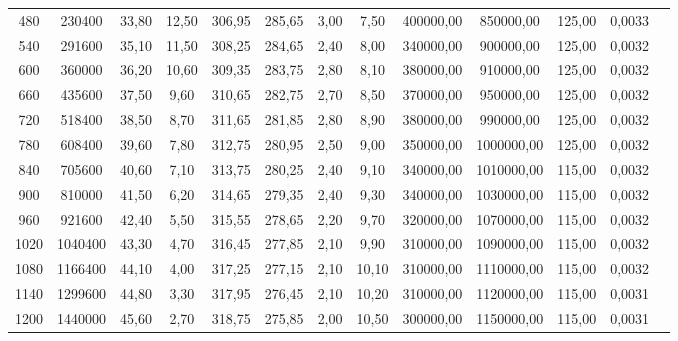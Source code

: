 \begin{table}
\begin{tabular}{S[table-format=3.0] S S S S S S S S S S S S[table-format=3.2]}
       480  &    230400   &   33,80   &    12,50   &  306,95   &  285,65   &      3,00   &      7,50   &  400000,00   &   850000,00   &  125,00    &      0,0033  \\
       540  &    291600   &   35,10   &    11,50   &  308,25   &  284,65   &      2,40   &      8,00   &  340000,00   &   900000,00   &  125,00    &      0,0032  \\
       600  &    360000   &   36,20   &    10,60   &  309,35   &  283,75   &      2,80   &      8,10   &  380000,00   &   910000,00   &  125,00    &      0,0032  \\
       660  &    435600   &   37,50   &     9,60   &  310,65   &  282,75   &      2,70   &      8,50   &  370000,00   &   950000,00   &  125,00    &      0,0032  \\
       720  &    518400   &   38,50   &     8,70   &  311,65   &  281,85   &      2,80   &      8,90   &  380000,00   &   990000,00   &  125,00    &      0,0032  \\
       780  &    608400   &   39,60   &     7,80   &  312,75   &  280,95   &      2,50   &      9,00   &  350000,00   &  1000000,00   &  125,00    &      0,0032  \\
       840  &    705600   &   40,60   &     7,10   &  313,75   &  280,25   &      2,40   &      9,10   &  340000,00   &  1010000,00   &  115,00    &      0,0032  \\
       900  &    810000   &   41,50   &     6,20   &  314,65   &  279,35   &      2,40   &      9,30   &  340000,00   &  1030000,00   &  115,00    &      0,0032  \\
       960  &    921600   &   42,40   &     5,50   &  315,55   &  278,65   &      2,20   &      9,70   &  320000,00   &  1070000,00   &  115,00    &      0,0032  \\
      1020  &   1040400   &   43,30   &     4,70   &  316,45   &  277,85   &      2,10   &      9,90   &  310000,00   &  1090000,00   &  115,00    &      0,0032  \\
      1080  &   1166400   &   44,10   &     4,00   &  317,25   &  277,15   &      2,10   &     10,10   &  310000,00   &  1110000,00   &  115,00    &      0,0032  \\
      1140  &   1299600   &   44,80   &     3,30   &  317,95   &  276,45   &      2,10   &     10,20   &  310000,00   &  1120000,00   &  115,00    &      0,0031  \\
      1200  &   1440000   &   45,60   &     2,70   &  318,75   &  275,85   &      2,00   &     10,50   &  300000,00   &  1150000,00   &  115,00    &      0,0031  \\

\end{tabular}
\end{table}
